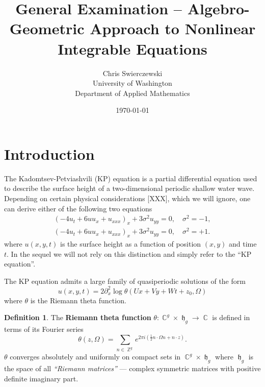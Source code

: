 \documentclass[10pt,twoside]{article}
\title{General Examination -- Algebro-Geometric
  Approach to Nonlinear Integrable Equations}
\author{
Chris Swierczewski\\
University of Washington\\
Department of Applied Mathematics}
\date{\today}
\theoremstyle{plain}
\theoremstyle{definition}
\newtheorem{definition}[theorem]{Definition}
\numberwithin{equation}{section}
\DeclareMathOperator{\ZZ}{\mathbb{Z}}
\DeclareMathOperator{\CC}{\mathbb{C}}
\DeclareMathOperator{\hh}{\mathfrak{h}}
\let\oldmarginpar\marginpar
\renewcommand\marginpar[1]{\oldmarginpar[\scriptsize #1]{\scriptsize #1}}
\begin{document}

\maketitle

\section{Introduction}

The Kadomtsev-Petviashvili (KP) equation is a partial differential
equation used to describe the surface height of a two-dimensional
periodic shallow water wave. Depending on certain physical
considerations [XXX], which we will ignore, one can derive either of the
following two equations
\begin{align}
  \left(-4u_t + 6uu_x + u_{xxx}\right)_x + 3\sigma^2 u_{yy} = 0, \quad
  \sigma^2 = -1, \label{eqn: KP1} \\
  \left(-4u_t + 6uu_x + u_{xxx}\right)_x + 3\sigma^2 u_{yy} = 0, \quad
  \sigma^2 = +1. \label{eqn: KP2}
\end{align}
where $u(x,y,t)$ is the surface height as a function of position $(x,y)$
and time $t$. In the sequel we will not rely on this distinction and
simply refer to the ``KP equation''.


The KP equation admits a large family of quasiperiodic solutions of the
form
\begin{equation} \label{eqn: kpsol}
  u(x,y,t) = 2 \partial_x^2 \log \theta(Ux+Vy+Wt+z_0, \Omega)
\end{equation}
where $\theta$ is the Riemann theta function.

\begin{definition} \label{def: riemanntheta}
  The {\bf Riemann theta function} $\theta: \CC^g \times \hh_g \to \CC$
  is defined in terms of its Fourier series
  \begin{equation} \label{eqn: riemanntheta}
    \theta(z,\Omega) = \sum_{n \in \ZZ^g}
    e^{2 \pi i \left( \tfrac{1}{2} n \cdot \Omega n + n \cdot z \right)}.
  \end{equation}
  $\theta$ converges absolutely and uniformly on compact sets in $\CC^g
  \times \hh_g$ where $\hh_g$ is the space of all {\it ``Riemann
    matrices''} --- complex symmetric matrices with positive definite
  imaginary part.
\end{definition}
\end{document}
